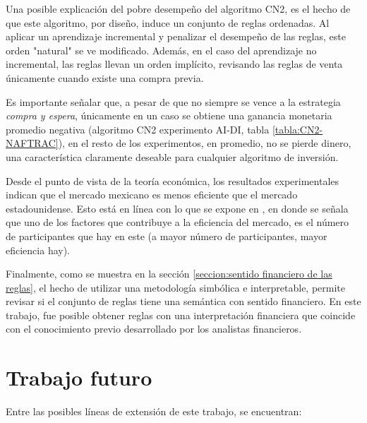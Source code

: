 \documentclass[12pt]{report}
\theoremstyle{break}
\theoremstyle{break}
\begin{document}
Una posible explicación del pobre desempeño del algoritmo CN2, es el hecho de que este algoritmo, por diseño, induce un conjunto de reglas ordenadas. Al aplicar un aprendizaje incremental y penalizar el desempeño de las reglas, este orden "natural" se ve modificado. Además, en el caso del aprendizaje no incremental, las reglas llevan un orden implícito, revisando las reglas de venta únicamente cuando existe una compra previa.

Es importante señalar que, a pesar de que no siempre se vence a la estrategia \textit{compra y espera}, únicamente en un caso se obtiene una ganancia monetaria promedio negativa (algoritmo CN2 experimento AI-DI, tabla \ref{tabla:CN2-NAFTRAC}), en el resto de los experimentos, en promedio, no se pierde dinero, una característica claramente deseable para cualquier algoritmo de inversión.

Desde el punto de vista de la teoría económica, los resultados experimentales indican que el mercado mexicano es menos eficiente que el mercado estadounidense. Esto está en línea con lo que se expone en \cite{CFA2019}, en donde se señala que uno de los factores que contribuye a la eficiencia del mercado, es el número de participantes que hay en este (a mayor número de participantes, mayor eficiencia hay).

Finalmente, como se muestra en la sección \ref{seccion:sentido financiero de las reglas}, el hecho de utilizar una metodología simbólica e interpretable, permite revisar si el conjunto de reglas tiene una semántica con sentido financiero. En este trabajo, fue posible obtener reglas con una interpretación financiera que coincide con el conocimiento previo desarrollado por los analistas financieros.

\section{Trabajo futuro}
\label{seccion:trabajo futuro}
Entre las posibles líneas de extensión de este trabajo, se encuentran:
\end{document}
